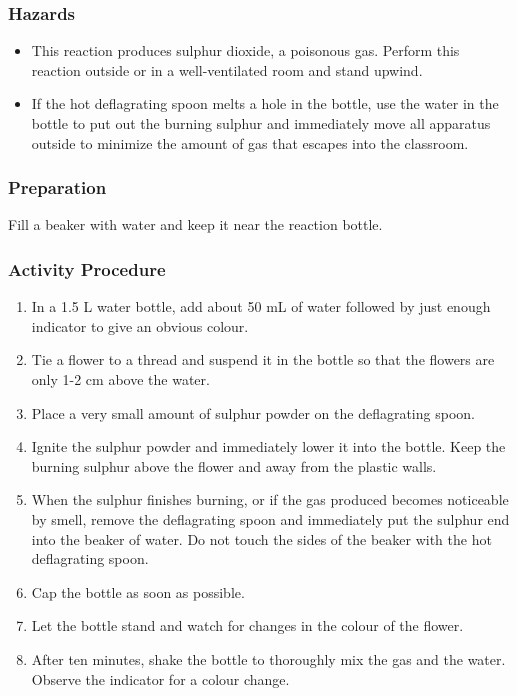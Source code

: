 \subsubsection{Hazards}
\begin{itemize}
\item{This reaction produces sulphur dioxide, a poisonous gas. Perform this reaction outside or in a well-ventilated room and stand upwind.}
\item{If the hot deflagrating spoon melts a hole in the bottle, use the water in the bottle to put out the burning sulphur and immediately move all apparatus outside to minimize the amount of gas that escapes into the classroom.}
\end{itemize}

\subsubsection{Preparation}
Fill a beaker with water and keep it near the reaction bottle.

\subsubsection{Activity Procedure}
\begin{enumerate}
\item{In a 1.5 L water bottle, add about 50 mL of water followed by just enough indicator to give an obvious colour.}
\item{Tie a flower to a thread and suspend it in the bottle so that the flowers are only 1-2 cm above the water.}
\item{Place a very small amount of sulphur powder on the deflagrating spoon.}
\item{Ignite the sulphur powder and immediately lower it into the bottle. Keep the burning sulphur above the flower and away from the plastic walls.}
\item{When the sulphur finishes burning, or if the gas produced becomes noticeable by smell, remove the deflagrating spoon and immediately put the sulphur end into the beaker of water. Do not touch the sides of the beaker with the hot deflagrating spoon.}
\item{Cap the bottle as soon as possible.}
\item{Let the bottle stand and watch for changes in the colour of the flower.}
\item{After ten minutes, shake the bottle to thoroughly mix the gas and the water. Observe the indicator for a colour change.}
\end{enumerate}

